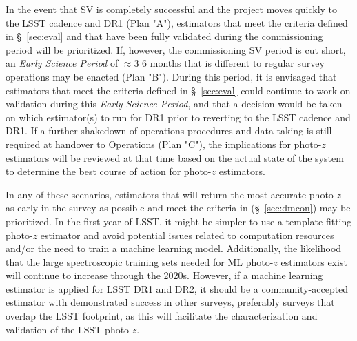 \documentclass[DM,authoryear,toc]{lsstdoc}
\begin{document}
In the event that SV is completely successful and the project moves quickly to the LSST cadence and DR1 (Plan "A"), estimators that  meet the criteria defined in \S~\ref{sec:eval} and that have been fully validated during the commissioning period will be prioritized. 
If, however, the commissioning SV period is cut short, an {\it Early Science Period} of $\approx$3\,\textendash\,6 months that is different to regular survey operations may be enacted (Plan "B").
During this period, it is envisaged that estimators that meet the criteria defined in \S~\ref{sec:eval} could continue to work on validation during this {\it Early Science Period}, and that a decision would be taken on which estimator(s) to run for DR1 prior to reverting to the LSST cadence and DR1. 
If a further shakedown of operations procedures and data taking is still required at handover to Operations (Plan "C"), the implications for photo-$z$ estimators will be reviewed at that time based on the actual state of the system to determine the best course of action for photo-$z$ estimators. 

In any of these scenarios, estimators that will return the most accurate photo-$z$ as early in the survey as possible and meet the criteria in (\S~\ref{sec:dmcon}) may be prioritized.
In the first year of LSST, it might be simpler to use a template-fitting photo-$z$ estimator and avoid potential issues related to computation resources and/or the need to train a machine learning model.
Additionally, the likelihood that the large spectroscopic training sets needed for ML photo-$z$ estimators exist will continue to increase through the 2020s.
However, if a machine learning estimator is applied for LSST DR1 and DR2, it should be a community-accepted estimator with demonstrated success in other surveys, preferably surveys that overlap the LSST footprint, as this will facilitate the characterization and validation of the LSST photo-$z$.
\end{document}
